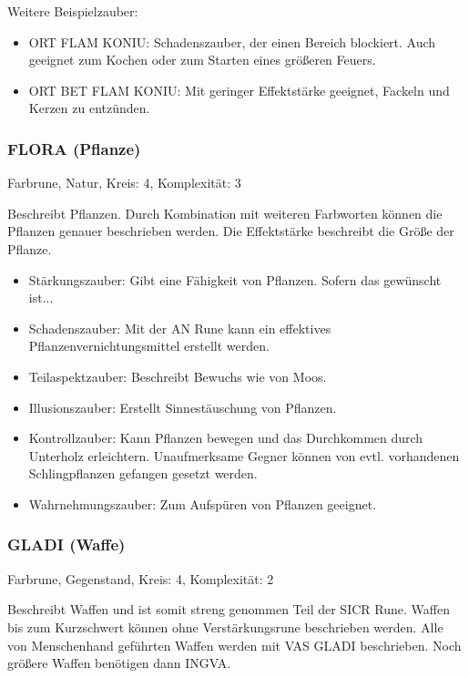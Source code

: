 \documentclass{article}
\begin{document}
Weitere Beispielzauber:

\begin{itemize}
\item ORT FLAM KONIU: Schadenszauber, der einen Bereich blockiert. Auch geeignet zum Kochen oder zum Starten eines größeren Feuers.
\item ORT BET FLAM KONIU: Mit geringer Effektstärke geeignet, Fackeln und Kerzen zu entzünden.
\end{itemize}

\subsubsection{FLORA (Pflanze)}

Farbrune, Natur, Kreis: 4, Komplexität: 3

Beschreibt Pflanzen. Durch Kombination mit weiteren Farbworten können die Pflanzen genauer beschrieben werden. Die
Effektstärke beschreibt die Größe der Pflanze.

\begin{itemize}
\item Stärkungszauber: Gibt eine Fähigkeit von Pflanzen. Sofern das gewünscht ist...
\item Schadenszauber: Mit der AN Rune kann ein effektives Pflanzenvernichtungsmittel erstellt werden.
\item Teilaspektzauber: Beschreibt Bewuchs wie von Moos.
\item Illusionszauber: Erstellt Sinnestäuschung von Pflanzen.
\item Kontrollzauber: Kann Pflanzen bewegen und das Durchkommen durch Unterholz erleichtern. Unaufmerksame Gegner können von evtl. vorhandenen Schlingpflanzen gefangen gesetzt werden.
\item Wahrnehmungszauber: Zum Aufspüren von Pflanzen geeignet.
\end{itemize}

\subsubsection{GLADI (Waffe)}

Farbrune, Gegenstand, Kreis: 4, Komplexität: 2

Beschreibt Waffen und ist somit streng genommen Teil der SICR Rune. Waffen bis zum Kurzschwert können ohne
Verstärkungsrune beschrieben werden. Alle von Menschenhand geführten Waffen werden mit VAS GLADI beschrieben. Noch
größere Waffen benötigen dann INGVA.
\end{document}
